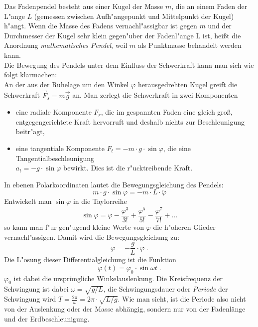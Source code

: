 Das Fadenpendel besteht aus einer Kugel der Masse $m$, die an einem Faden der L"ange $L$ (gemessen zwischen Aufh"angepunkt und Mittelpunkt der Kugel) h"angt. Wenn die Masse des Fadens vernachl"assigbar ist gegen $m$ und der Durchmesser der Kugel sehr klein gegen"uber der Fadenl"ange L ist, hei{\ss}t die Anordnung \emph{mathematisches Pendel}, weil $m$ als Punktmasse behandelt werden kann.\\
Die Bewegung des Pendels unter dem Einfluss der Schwerkraft kann man sich wie folgt klarmachen:\\ 
An der aus der Ruhelage um den Winkel $\varphi$ herausgedrehten Kugel greift die Schwerkraft $\vec{F}_s = m\vec{g}$ an. Man zerlegt die Schwerkraft in zwei Komponenten
\begin{itemize}
 \item eine radiale Komponente $F_r$, die im gespannten Faden eine gleich gro{\ss}, entgegengerichtete Kraft hervorruft und deshalb nichts zur Beschleunigung beitr"agt,
 \item eine tangentiale Komponente $F_t = -m\cdot g\cdot\sin\varphi$, die eine Tangentialbeschleunigung \\
 $a_t = -g\cdot\sin\varphi$ bewirkt. Dies ist die r"ucktreibende Kraft.
\end{itemize}
%
In ebenen Polarkoordinaten lautet die Bewegungsgleichung des Pendels:
\begin{equation}
m\cdot g\cdot\sin\varphi = -m\cdot L\cdot \ddot{\varphi}
\end{equation}
%
Entwickelt man $\sin\varphi$ in die Taylorreihe
\begin{equation*}
\sin\varphi = \varphi - \frac{\varphi^3}{3!}+ \frac{\varphi^5}{5!} - \frac{\varphi^7}{7!}+ ...
\end{equation*}
so kann man f"ur gen"ugend kleine Werte von $\varphi$ die h"oheren Glieder vernachl"assigen. Damit wird die Bewegungsgleichung zu:
\begin{equation}
\ddot{\varphi} = - \frac{g}{L}\cdot\varphi \; .
\end{equation}
Die L"osung dieser Differentialgleichung ist die Funktion
\begin{equation}
\varphi (t) = \varphi_0\cdot\sin\omega t \;.
\end{equation}
%
$\varphi_0$ ist dabei die ursprüngliche Winkelauslenkung. Die Kreisfrequenz der Schwingung ist dabei $\omega = \sqrt{g/L}$, die Schwingungsdauer oder \emph{Periode} der Schwingung wird $T = \frac{2\pi}{\omega} = 2\pi\cdot\sqrt{L/g}$. Wie man sieht, ist die Periode also nicht von der Auslenkung oder der Masse abhängig, sondern nur von der Fadenlänge und der Erdbeschleunigung.

